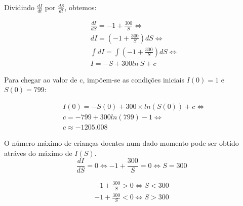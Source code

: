 \documentclass[portuguese, a4paper]{article}
\begin{document}
	\subsection{} \label{sec:III.2}
		\subsubsection{} \label{sec:III.2a)}
		\par %
		Dividindo $\frac{dI}{dt}$ por $\frac{dS}{dt}$, obtemos:

		\begin{equation}
		\begin{split}
			& \frac{dI}{dS} = -1 + \frac{300}{S} \Leftrightarrow \\
			& dI = \left(-1 + \frac{300}{S}\right)dS \Leftrightarrow \\
			& \int dI = \int\left(-1 + \frac{300}{S}\right)dS \Leftrightarrow \\
			& I = -S + 300ln~S + c
		\end{split}
		\end{equation}

		\par
		Para chegar ao valor de c, impõem-se as condições iniciais $I(0) = 1$ e $S(0) = 799$:

		\begin{equation}
		\begin{split}
			& I(0) = -S(0) + 300 \times ln(S(0)) + c \Leftrightarrow \\
			& c = -799 + 300ln(799) - 1 \Leftrightarrow \\
			& c \approx -1205.008
		\end{split}
		\end{equation}

		\par
		O número máximo de crianças doentes num dado momento pode ser obtido
		atráves do máximo de $I(S)$.
		\begin{equation}
			\label{eq:root}
			\frac{dI}{dS} = 0 \Leftrightarrow -1 + \frac{300}{S} = 0
			\Leftrightarrow S = 300
		\end{equation}

		\begin{equation}
		\begin{split}
			\label{eq:comp}
			 -1 + \frac{300}{S} > 0 \Leftrightarrow S < 300 \\
			 -1 + \frac{300}{S} < 0 \Leftrightarrow S > 300
		\end{split}
		\end{equation}
\end{document}
